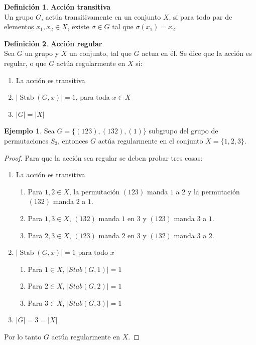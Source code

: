 \documentclass[12pt]{book}
\theoremstyle{definition}
\newtheorem{definition}{Definición}
\newtheorem{example}{Ejemplo}
\DeclareMathOperator{\Stab}{Stab}
\begin{document}
\begin{definition}\textbf{Acción transitiva}\\
  Un grupo $G$, actúa transitivamente en un conjunto $X$, si para todo
  par de elementos $x_1, x_2 \in X$, existe $\sigma \in G$ tal que $\sigma (x_1) = x_2$.
\end{definition}



\begin{definition}\textbf{Acción regular}\\
  Sea $G$ un grupo y $X$ un conjunto, tal que $G$ actua en él. Se dice que la acción es regular, o
  que $G$ actúa regularmente en $X$ si:
  \begin{enumerate}
  \item La acción es transitiva
  \item $|\Stab (G,x)|=1$, para toda $x\in X$
  \item $|G|=|X|$
  \end{enumerate}
\end{definition}


\begin{example}
  Sea $G=\{ (123),(132),(1)\}$ subgrupo del grupo de permutaciones $S_3$, entonces $G$
  actúa regularmente en el conjunto $X=\{ 1,2,3\}$.
\begin{proof} Para que la acción sea regular se deben probar tres cosas:

  \begin{enumerate}
  \item La acción es transitiva
    \begin{enumerate}
    \item Para $1,2\in X$, la permutación $(123)$ manda $1$ a $2$ y la
      permutación $(132)$ manda $2$ a $1$.
    \item Para $1,3\in X$, $(132)$ manda $1$ en $3$ y $(123)$ manda
      $3$ a $1$.
    \item Para $2,3\in X$, $(123)$ manda $2$ en $3$ y $(132)$ manda
      $3$ a $2$.
    \end{enumerate}
  \item $|\Stab (G,x)|=1$ para todo $x$
    \begin{enumerate}
    \item Para $1\in X$, $|Stab (G,1)|=1$
    \item Para $2\in X$, $|Stab (G,2)|=1$
    \item Para $3\in X$, $|Stab (G,3)|=1$
    \end{enumerate}
  \item $|G|=3=|X|$
  \end{enumerate}
  Por lo tanto $G$ actúa regularmente en $X$.
\end{proof}
\end{example}
\end{document}
